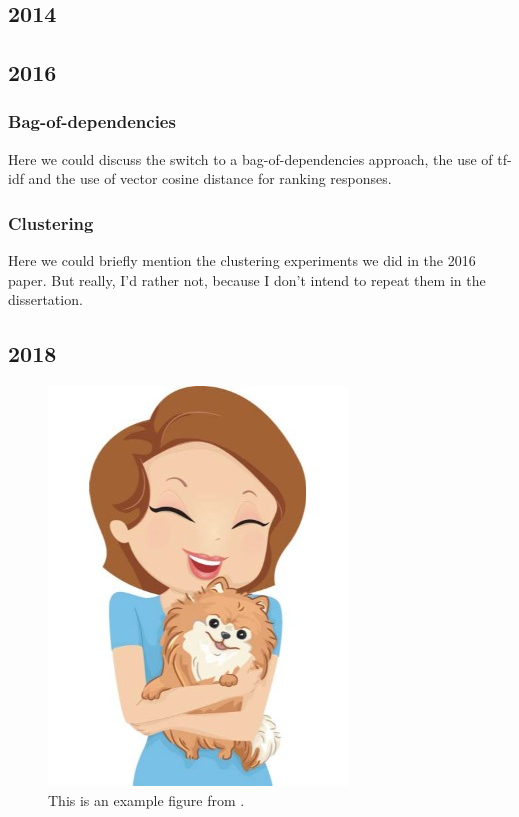 \subsection{2014}
\citet{king:dickinson:14}

\subsection{2016}
\citep{king:dickinson:16}

\subsubsection{Bag-of-dependencies}
Here we could discuss the switch to a bag-of-dependencies approach, the use of tf-idf and the use of vector cosine distance for ranking responses.

\subsubsection{Clustering}
Here we could briefly mention the clustering experiments we did in the 2016 paper. But really, I'd rather not, because I don't intend to repeat them in the dissertation.

\subsection{2018}
\cite{king:dickinson:18}

\begin{figure}
\includegraphics[width=.7\textwidth]{figures/I29.jpg}
\caption{This is an example figure from \citet{king:dickinson:18}.}
\label{figure:KandD2018}
\end{figure}

